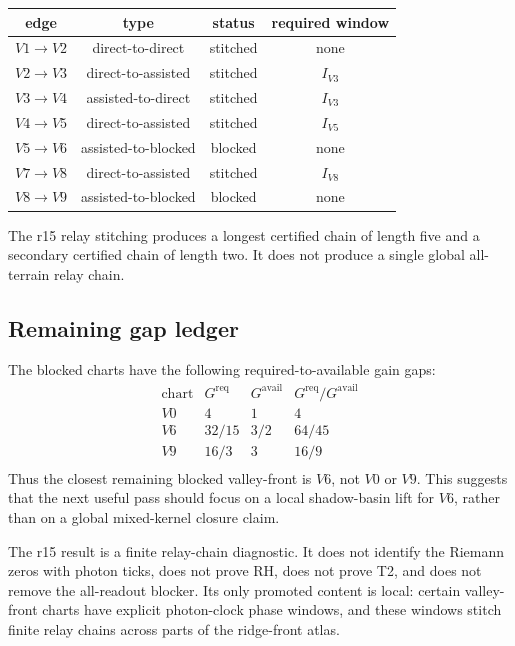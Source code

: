 \begin{center}
\begin{tabular}{c|c|c|c}
\toprule
edge & type & status & required window\\
\midrule
$V1\to V2$  & direct-to-direct  & stitched  & none\\
$V2\to V3$  & direct-to-assisted  & stitched  & $I_{V3}$\\
$V3\to V4$  & assisted-to-direct  & stitched  & $I_{V3}$\\
$V4\to V5$  & direct-to-assisted  & stitched  & $I_{V5}$\\
$V5\to V6$  & assisted-to-blocked  & blocked  & none\\
$V7\to V8$  & direct-to-assisted  & stitched  & $I_{V8}$\\
$V8\to V9$  & assisted-to-blocked  & blocked  & none\\
\bottomrule
\end{tabular}
\end{center}

\begin{corollary}
\label{cor:v470-r15-finite-chain-status}
The r15 relay stitching produces a longest certified chain of length five and a
secondary certified chain of length two.  It does not produce a single global
all-terrain relay chain.
\end{corollary}

\subsection{Remaining gap ledger}
\label{subsec:v470-r15-remaining-gap-ledger}

The blocked charts have the following required-to-available gain gaps:
\[
\begin{array}{c|c|c|c}
\text{chart} & G^{\mathrm{req}} & G^{\mathrm{avail}} &
G^{\mathrm{req}}/G^{\mathrm{avail}}\\
\hline
V0 & 4 & 1 & 4\\
V6 & 32/15 & 3/2 & 64/45\\
V9 & 16/3 & 3 & 16/9\\
\end{array}
\]
Thus the closest remaining blocked valley-front is \(V6\), not \(V0\) or
\(V9\).  This suggests that the next useful pass should focus on a local
shadow-basin lift for \(V6\), rather than on a global mixed-kernel closure claim.

\begin{remark}[r15 guard]
The r15 result is a finite relay-chain diagnostic.  It does not identify the
Riemann zeros with photon ticks, does not prove RH, does not prove T2, and does
not remove the all-readout blocker.  Its only promoted content is local: certain
valley-front charts have explicit photon-clock phase windows, and these windows
stitch finite relay chains across parts of the ridge-front atlas.
\end{remark}


